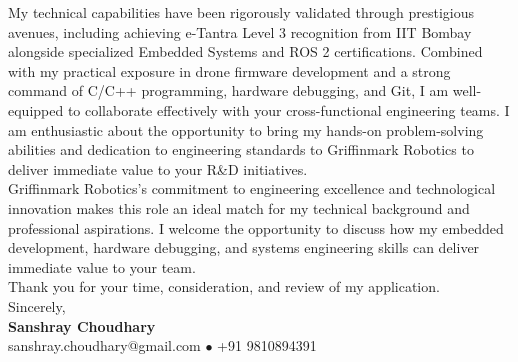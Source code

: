 \documentclass[10pt,a4paper]{article}%
\begin{document}
\noindent My technical capabilities have been rigorously validated through prestigious avenues, including achieving e-Tantra Level 3 recognition from IIT Bombay alongside specialized Embedded Systems and ROS 2 certifications. Combined with my practical exposure in drone firmware development and a strong command of C/C++ programming, hardware debugging, and Git, I am well-equipped to collaborate effectively with your cross-functional engineering teams. I am enthusiastic about the opportunity to bring my hands-on problem-solving abilities and dedication to engineering standards to Griffinmark Robotics to deliver immediate value to your R\&D initiatives. \vspace{8pt}\\

\noindent Griffinmark Robotics's commitment to engineering excellence and technological innovation makes this role an ideal match for my technical background and professional aspirations. I welcome the opportunity to discuss how my embedded development, hardware debugging, and systems engineering skills can deliver immediate value to your team. \vspace{8pt}\\%

\noindent Thank you for your time, consideration, and review of my application. \vspace{18pt}\\%

\noindent Sincerely, \vspace{8pt}\\%
\textbf{Sanshray Choudhary} \\%
sanshray.choudhary@gmail.com $\bullet$ +91 9810894391 \\%
\end{document}
